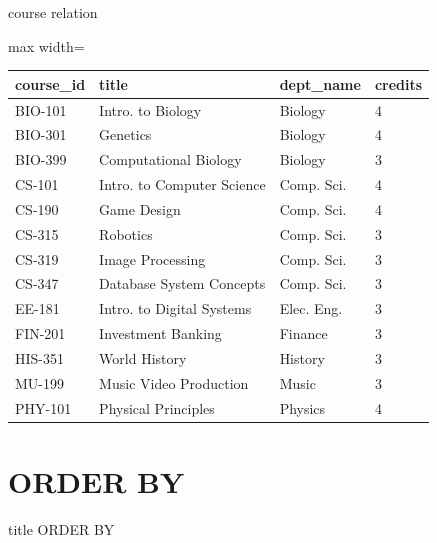 \documentclass[aspectratio=169, xcolor=dvipsnames]{beamer}
\begin{document}
\begin{frame}{course relation}
    \begin{center}
        \begin{adjustbox}{max width=\textwidth}
        \begin{tabular}{|l|l|l|l|}
        \hline
        \textbf{course\_id} & \textbf{title} & \textbf{dept\_name} & \textbf{credits} \\ \hline
        BIO-101 & Intro. to Biology & Biology & 4 \\ \hline
        BIO-301 & Genetics & Biology & 4 \\ \hline
        BIO-399 & Computational Biology & Biology & 3 \\ \hline
        CS-101 & Intro. to Computer Science & Comp. Sci. & 4 \\ \hline
        CS-190 & Game Design & Comp. Sci. & 4 \\ \hline
        CS-315 & Robotics & Comp. Sci. & 3 \\ \hline
        CS-319 & Image Processing & Comp. Sci. & 3 \\ \hline
        CS-347 & Database System Concepts & Comp. Sci. & 3 \\ \hline
        EE-181 & Intro. to Digital Systems & Elec. Eng. & 3 \\ \hline
        FIN-201 & Investment Banking & Finance & 3 \\ \hline
        HIS-351 & World History & History & 3 \\ \hline
        MU-199 & Music Video Production & Music & 3 \\ \hline
        PHY-101 & Physical Principles & Physics & 4 \\ \hline
        \end{tabular}
        \end{adjustbox}
    \end{center}
\end{frame}

\section{ORDER BY}
\begin{frame}
  \vfill
  \centering
  \begin{beamercolorbox}[sep=8pt,center,shadow=true,rounded=true]{title}
    ORDER BY\par%
  \end{beamercolorbox}
  \vfill
\end{frame}
\end{document}
